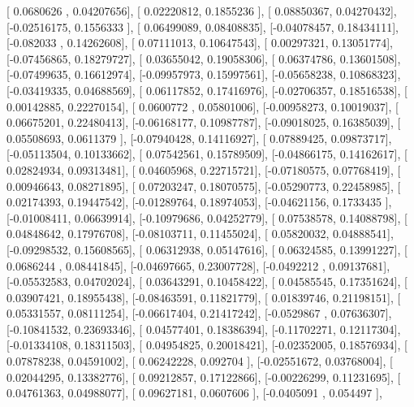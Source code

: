 \documentclass{article}
\begin{document}
       [ 0.0680626 ,  0.04207656],
       [ 0.02220812,  0.1855236 ],
       [ 0.08850367,  0.04270432],
       [-0.02516175,  0.1556333 ],
       [ 0.06499089,  0.08408835],
       [-0.04078457,  0.18434111],
       [-0.082033  ,  0.14262608],
       [ 0.07111013,  0.10647543],
       [ 0.00297321,  0.13051774],
       [-0.07456865,  0.18279727],
       [ 0.03655042,  0.19058306],
       [ 0.06374786,  0.13601508],
       [-0.07499635,  0.16612974],
       [-0.09957973,  0.15997561],
       [-0.05658238,  0.10868323],
       [-0.03419335,  0.04688569],
       [ 0.06117852,  0.17416976],
       [-0.02706357,  0.18516538],
       [ 0.00142885,  0.22270154],
       [ 0.0600772 ,  0.05801006],
       [-0.00958273,  0.10019037],
       [ 0.06675201,  0.22480413],
       [-0.06168177,  0.10987787],
       [-0.09018025,  0.16385039],
       [ 0.05508693,  0.0611379 ],
       [-0.07940428,  0.14116927],
       [ 0.07889425,  0.09873717],
       [-0.05113504,  0.10133662],
       [ 0.07542561,  0.15789509],
       [-0.04866175,  0.14162617],
       [ 0.02824934,  0.09313481],
       [ 0.04605968,  0.22715721],
       [-0.07180575,  0.07768419],
       [ 0.00946643,  0.08271895],
       [ 0.07203247,  0.18070575],
       [-0.05290773,  0.22458985],
       [ 0.02174393,  0.19447542],
       [-0.01289764,  0.18974053],
       [-0.04621156,  0.1733435 ],
       [-0.01008411,  0.06639914],
       [-0.10979686,  0.04252779],
       [ 0.07538578,  0.14088798],
       [ 0.04848642,  0.17976708],
       [-0.08103711,  0.11455024],
       [ 0.05820032,  0.04888541],
       [-0.09298532,  0.15608565],
       [ 0.06312938,  0.05147616],
       [ 0.06324585,  0.13991227],
       [ 0.0686244 ,  0.08441845],
       [-0.04697665,  0.23007728],
       [-0.0492212 ,  0.09137681],
       [-0.05532583,  0.04702024],
       [ 0.03643291,  0.10458422],
       [ 0.04585545,  0.17351624],
       [ 0.03907421,  0.18955438],
       [-0.08463591,  0.11821779],
       [ 0.01839746,  0.21198151],
       [ 0.05331557,  0.08111254],
       [-0.06617404,  0.21417242],
       [-0.0529867 ,  0.07636307],
       [-0.10841532,  0.23693346],
       [ 0.04577401,  0.18386394],
       [-0.11702271,  0.12117304],
       [-0.01334108,  0.18311503],
       [ 0.04954825,  0.20018421],
       [-0.02352005,  0.18576934],
       [ 0.07878238,  0.04591002],
       [ 0.06242228,  0.092704  ],
       [-0.02551672,  0.03768004],
       [ 0.02044295,  0.13382776],
       [ 0.09212857,  0.17122866],
       [-0.00226299,  0.11231695],
       [ 0.04761363,  0.04988077],
       [ 0.09627181,  0.0607606 ],
       [-0.0405091 ,  0.054497  ],
\end{document}
